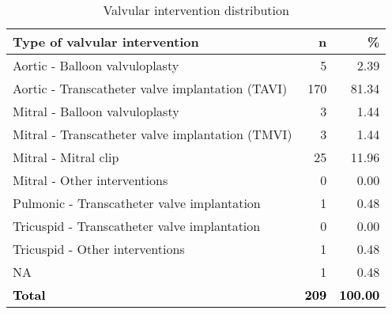 \documentclass[
]{article}
\begin{document}
\begin{longtable}[t]{lrr}
\caption{\label{tab:table 5}Valvular intervention distribution}\\
\toprule
Type of valvular intervention & n & \%\\
\midrule
Aortic - Balloon valvuloplasty & 5 & 2.39\\
Aortic - Transcatheter valve implantation (TAVI) & 170 & 81.34\\
Mitral - Balloon valvuloplasty & 3 & 1.44\\
Mitral - Transcatheter valve implantation (TMVI) & 3 & 1.44\\
Mitral - Mitral clip & 25 & 11.96\\
\addlinespace
Mitral - Other interventions & 0 & 0.00\\
Pulmonic - Transcatheter valve implantation & 1 & 0.48\\
Tricuspid - Transcatheter valve implantation & 0 & 0.00\\
Tricuspid - Other interventions & 1 & 0.48\\
NA & 1 & 0.48\\
\addlinespace
\textcolor{black}{\textbf{Total}} & \textcolor{black}{\textbf{209}} & \textcolor{black}{\textbf{100.00}}\\
\bottomrule
\end{longtable}
\end{document}
